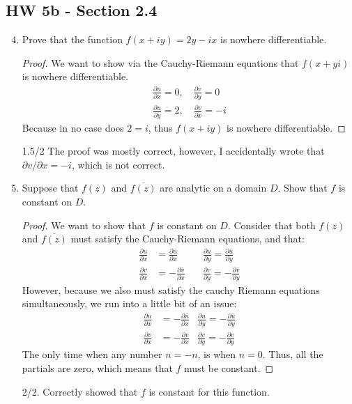 \subsection*{HW 5b - Section 2.4}
\begin{enumerate}
\setcounter{enumi}{3}
\item Prove that the function $f(x+iy) = 2y-ix$ is nowhere differentiable.
\begin{proof}
	We want to show via the Cauchy-Riemann equations that $f(x + yi)$ is nowhere differentiable. \gline{}
	\begin{align*}
		\frac{\partial u}{\partial x} = 0,\quad \frac{\partial v}{\partial y}=0\\
		\frac{\partial u}{\partial y} = 2,\quad\frac{\partial v}{\partial x} = -i
	\end{align*}
	Because in no case does $2 = i$, thus $f(x+iy)$ is nowhere differentiable.  
\end{proof}
\begin{grade}
	1.5/2 The proof was mostly correct, however, I accidentally wrote that $\partial v / \partial x = -i$, which is not correct.
\end{grade}
\item Suppose that $f(z)$ and $\overline{f(z)}$ are analytic on a domain $D$. Show that $f$ is constant on $D$. 
\begin{proof}
	We want to show that $f$ is constant on $D$. \gline{}
	Consider that both $f(z)$ and $\overline{f(z)}$ must satisfy the Cauchy-Riemann equations, and that:
	\begin{align*}
		\frac{\partial u}{\partial x} &=\frac{\partial \bar u}{\partial x}\quad&
		\frac{\partial u}{\partial y} = \frac{\partial \bar u}{\partial y}\\
		\frac{\partial v}{\partial x} &=-\frac{\partial \bar v}{\partial x}\quad&
		\frac{\partial v}{\partial y} = -\frac{\partial \bar v}{\partial y}
	\end{align*}
	However, because we also must satisfy the cauchy Riemann equations simultaneously, we run into a little bit of an issue:
	\begin{align*}
		\frac{\partial u}{\partial x}&= -\frac{\partial\bar u}{\partial x}&\frac{\partial u}{\partial y}= -\frac{\partial\bar u}{\partial y}\\
		\frac{\partial v}{\partial x}&= -\frac{\partial v}{\partial x}&\frac{\partial v}{\partial y}=-\frac{\partial v}{\partial y}
	\end{align*}
	The only time when any number $n = -n$, is when $n = 0$. Thus, all the partials are zero, which means that $f$ must be constant. 
\end{proof}
\begin{grade}
	2/2. Correctly showed that $f$ is constant for this function.
\end{grade}
	

\end{enumerate}
